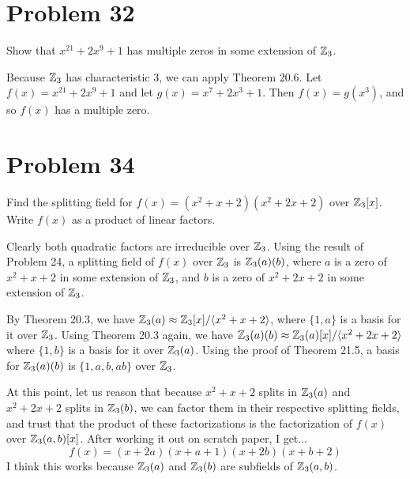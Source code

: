 \documentclass{article}
\begin{document}
\section*{Problem 32}

Show that $x^{21}+2x^9+1$ has multiple zeros in some extension of $\mathbb{Z}_3$.

Because $\mathbb{Z}_3$ has characteristic 3, we can apply Theorem 20.6.
Let $f(x)=x^{21}+2x^9+1$ and let $g(x)=x^7+2x^3+1$.
Then $f(x)=g(x^3)$, and so $f(x)$ has a multiple zero.

\pagebreak
\section*{Problem 34}

Find the splitting field for $f(x)=(x^2+x+2)(x^2+2x+2)$ over $\mathbb{Z}_3[x]$.
Write $f(x)$ as a product of linear factors.

Clearly both quadratic factors are irreducible over $\mathbb{Z}_3$.
Using the result of Problem 24, a splitting field of $f(x)$ over $\mathbb{Z}_3$
is $\mathbb{Z}_3(a)(b)$, where $a$ is a zero of $x^2+x+2$ in some extension of
$\mathbb{Z}_3$, and $b$ is a zero of $x^2+2x+2$ in some extension of $\mathbb{Z}_3$.

By Theorem 20.3, we have $\mathbb{Z}_3(a)\approx \mathbb{Z}_3[x]/\langle x^2+x+2\rangle$,
where $\{1,a\}$ is a basis for it over $\mathbb{Z}_3$.  Using Theorem 20.3 again,
we have $\mathbb{Z}_3(a)(b)\approx\mathbb{Z}_3(a)[x]/\langle x^2+2x+2\rangle$ where
$\{1,b\}$ is a basis for it over $\mathbb{Z}_3(a)$.  Using the proof of Theorem 21.5,
a basis for $\mathbb{Z}_3(a)(b)$ is $\{1,a,b,ab\}$ over $\mathbb{Z}_3$.

At this point, let us reason that because $x^2+x+2$ splits in $\mathbb{Z}_3(a)$
and $x^2+2x+2$ splits in $\mathbb{Z}_3(b)$, we can factor them in their respective splitting fields,
and trust that the product of these factorizations is the factorization of $f(x)$
over $\mathbb{Z}_3(a,b)[x]$.  After working it out on scratch paper, I get...
\begin{equation*}
f(x)=(x+2a)(x+a+1)(x+2b)(x+b+2)
\end{equation*}
I think this works because $\mathbb{Z}_3(a)$ and $\mathbb{Z}_3(b)$ are subfields of $\mathbb{Z}_3(a,b)$.
\end{document}
